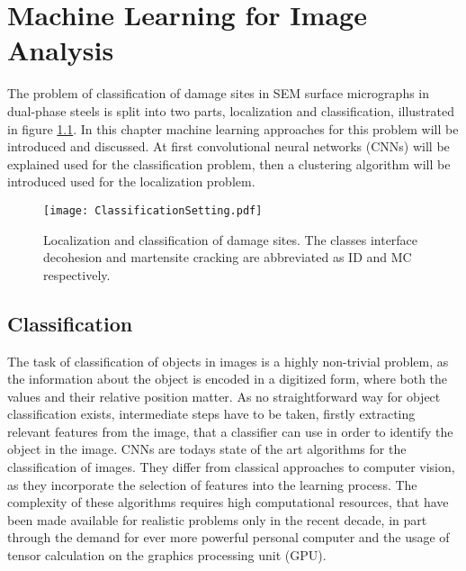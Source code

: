 
\chapter{Machine Learning for Image Analysis} %

\label{CNN} %

The problem of classification of damage sites in SEM surface micrographs in dual-phase steels is split into two parts, localization and classification, illustrated in figure \ref{fig:DPSteelProblem}. In this chapter machine learning approaches for this problem will be introduced and discussed. At first convolutional neural networks (CNNs) will be explained used for the classification problem, then a clustering algorithm will be introduced used for the localization problem. \\

\begin{figure}
\centering
\texttt{[image: ClassificationSetting.pdf]}
\caption{Localization and classification of damage sites. The classes interface decohesion and martensite cracking are abbreviated as ID and MC respectively.}
\label{fig:DPSteelProblem}
\end{figure}

\section{Classification}

The task of classification of objects in images is a highly non-trivial problem, as the information about the object is encoded in a digitized form, where both the values and their relative position matter. As no straightforward way for object classification exists, intermediate steps have to be taken, firstly extracting relevant features from the image, that a classifier can use in order to identify the object in the image. CNNs are todays state of the art algorithms for the classification of images. They differ from classical approaches to computer vision, as they incorporate the selection of features into the learning process. The complexity of these algorithms requires high computational resources, that have been made available for realistic problems only in the recent decade, in part through the demand for ever more powerful personal computer and the usage of tensor calculation on the graphics processing unit (GPU). \\


